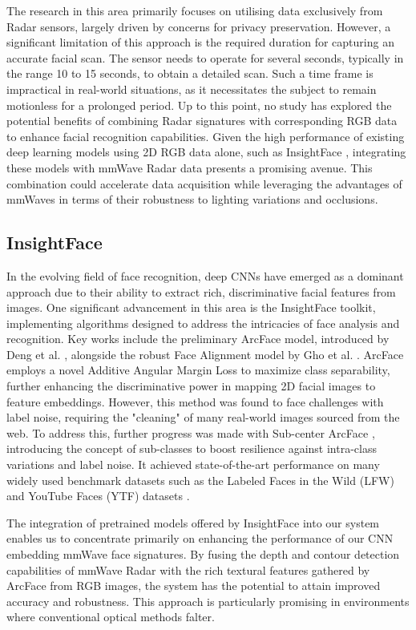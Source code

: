 \documentclass{interim}
\begin{document}
The research in this area primarily focuses on utilising data exclusively from Radar sensors, largely driven by concerns for privacy preservation. However, a significant limitation of this approach is the required duration for capturing an accurate facial scan. The sensor needs to operate for several seconds, typically in the range 10 to 15 seconds, to obtain a detailed scan. Such a time frame is impractical in real-world situations, as it necessitates the subject to remain motionless for a prolonged period. Up to this point, no study has explored the potential benefits of combining Radar signatures with corresponding RGB data to enhance facial recognition capabilities. Given the high performance of existing deep learning models using 2D RGB data alone, such as InsightFace \cite{deng2018arcface}, integrating these models with mmWave Radar data presents a promising avenue. This combination could accelerate data acquisition while leveraging the advantages of mmWaves in terms of their robustness to lighting variations and occlusions.


\subsection{InsightFace}
\label{background:insightface}
In the evolving field of face recognition, deep CNNs have emerged as a dominant approach due to their ability to extract rich, discriminative facial features from images. One significant advancement in this area is the InsightFace toolkit, implementing algorithms designed to address the intricacies of face analysis and recognition. Key works include the preliminary ArcFace model, introduced by Deng et al. \cite{deng2018arcface}, alongside the robust Face Alignment model by Gho et al. \cite{guo2018stacked}. ArcFace employs a novel Additive Angular Margin Loss to maximize class separability, further enhancing the discriminative power in mapping 2D facial images to feature embeddings. However, this method was found to face challenges with label noise, requiring the "cleaning" of many real-world images sourced from the web. To address this, further progress was made with Sub-center ArcFace \cite{deng2020subcenter}, introducing the concept of sub-classes to boost resilience against intra-class variations and label noise. It achieved state-of-the-art performance on many widely used benchmark datasets such as the Labeled Faces in the Wild (LFW) \cite{huang2008labeled} and YouTube Faces (YTF) datasets \cite{wolf2011face}.

The integration of pretrained models offered by InsightFace into our system enables us to concentrate primarily on enhancing the performance of our CNN embedding mmWave face signatures. By fusing the depth and contour detection capabilities of mmWave Radar with the rich textural features gathered by ArcFace from RGB images, the system has the potential to attain improved accuracy and robustness. This approach is particularly promising in environments where conventional optical methods falter.
\end{document}

